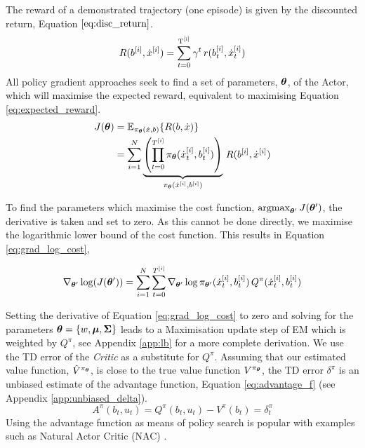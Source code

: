 The reward of a demonstrated trajectory (one episode) is given by the discounted return, Equation $\ref{eq:disc_return}$.
\begin{equation}\label{eq:disc_return}
 R(b^{[i]},\dot{x}^{[i]}) = \sum_{t=0}^{\mathrm{T^{[i]}}} \gamma^t \, r(b^{[i]}_t,\dot{x}^{[i]}_t)
\end{equation}
All policy gradient approaches seek to find a set of parameters, $\boldsymbol{\theta}$, of the Actor,
which will maximise the expected reward, equivalent to maximising Equation \ref{eq:expected_reward}.
\begin{align}\label{eq:expected_reward}
 J(\boldsymbol{\theta}) &= \mathbb{E}_{\pi_{\boldsymbol{\theta}}(\dot{x},b)}\{R(b,\dot{x})\} \nonumber \\
	  &= \sum\limits_{i=1}^{N}   \underbrace{\left( \prod_{t=0}^{T^{[i]}} \pi_{\boldsymbol{\theta}}(\dot{x}^{[i]}_t,b^{[i]}_t) \right)}_{\pi_{\boldsymbol{\theta}}(\dot{x}^{[i]},b^{[i]})} \, R(b^{[i]},\dot{x}^{[i]}) 
\end{align}

To find the parameters which maximise the cost function, $\argmax_{\Para'} J(\Para')$, the derivative is taken and 
set to zero. As this cannot be done directly, we maximise the logarithmic lower bound   
of the cost function. This results in Equation \ref{eq:grad_log_cost},

\begin{equation} \label{eq:grad_log_cost}
    \nabla_{\boldsymbol{\theta}'}\log(J(\boldsymbol{\theta}')) = \sum\limits_{i=1}^{N} \sum\limits_{t=0}^{T^{[i]}} \nabla_{\boldsymbol{\theta}'}\log \pi_{\boldsymbol{\theta}'}(\dot{x}^{[i]}_t,b^{[i]}_t) \, Q^{\pi}(\dot{x}^{[i]}_t,b^{[i]}_t)
\end{equation}

Setting the derivative of Equation \ref{eq:grad_log_cost} to zero and solving for the parameters
$\boldsymbol{\theta}=\{w,\boldsymbol{\mu},\boldsymbol{\Sigma}\}$ leads to a Maximisation update step of EM
which is weighted by $Q^{\pi}$, see Appendix \ref{app:lb} for a more complete derivation.
We use the TD error of the \textit{Critic} as a substitute for $Q^{\pi}$. Assuming that our estimated value function, $\hat{V}^{\pi_{\boldsymbol{\theta}}}$, 
is close to the true value function $V^{\pi_{\boldsymbol{\theta}}}$, the TD error $\delta^{\pi}$ is an unbiased estimate of the advantage function, Equation \ref{eq:advantage_f} 
(see Appendix \ref{app:unbiased_delta}).
\begin{equation}\label{eq:advantage_f}
 A^{\pi}(b_t,u_t) = Q^{\pi}(b_t,u_t) - V^{\pi}(b_t) = \delta^{\pi}_t
\end{equation}
Using the advantage function as means of policy search is popular with examples such as
Natural Actor Critic (NAC) \cite{peter_nac_2008}.

